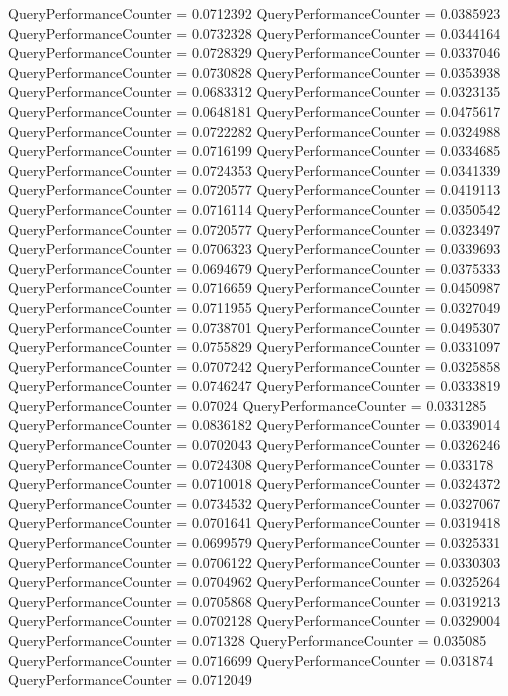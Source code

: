 \documentclass[9pt]{article}
\theoremstyle{plain}
\theoremstyle{definition}
\theoremstyle{remark}
\numberwithin{equation}{section}
\begin{document}
QueryPerformanceCounter  =  0.0712392
QueryPerformanceCounter  =  0.0385923
QueryPerformanceCounter  =  0.0732328
QueryPerformanceCounter  =  0.0344164
QueryPerformanceCounter  =  0.0728329
QueryPerformanceCounter  =  0.0337046
QueryPerformanceCounter  =  0.0730828
QueryPerformanceCounter  =  0.0353938
QueryPerformanceCounter  =  0.0683312
QueryPerformanceCounter  =  0.0323135
QueryPerformanceCounter  =  0.0648181
QueryPerformanceCounter  =  0.0475617
QueryPerformanceCounter  =  0.0722282
QueryPerformanceCounter  =  0.0324988
QueryPerformanceCounter  =  0.0716199
QueryPerformanceCounter  =  0.0334685
QueryPerformanceCounter  =  0.0724353
QueryPerformanceCounter  =  0.0341339
QueryPerformanceCounter  =  0.0720577
QueryPerformanceCounter  =  0.0419113
QueryPerformanceCounter  =  0.0716114
QueryPerformanceCounter  =  0.0350542
QueryPerformanceCounter  =  0.0720577
QueryPerformanceCounter  =  0.0323497
QueryPerformanceCounter  =  0.0706323
QueryPerformanceCounter  =  0.0339693
QueryPerformanceCounter  =  0.0694679
QueryPerformanceCounter  =  0.0375333
QueryPerformanceCounter  =  0.0716659
QueryPerformanceCounter  =  0.0450987
QueryPerformanceCounter  =  0.0711955
QueryPerformanceCounter  =  0.0327049
QueryPerformanceCounter  =  0.0738701
QueryPerformanceCounter  =  0.0495307
QueryPerformanceCounter  =  0.0755829
QueryPerformanceCounter  =  0.0331097
QueryPerformanceCounter  =  0.0707242
QueryPerformanceCounter  =  0.0325858
QueryPerformanceCounter  =  0.0746247
QueryPerformanceCounter  =  0.0333819
QueryPerformanceCounter  =  0.07024
QueryPerformanceCounter  =  0.0331285
QueryPerformanceCounter  =  0.0836182
QueryPerformanceCounter  =  0.0339014
QueryPerformanceCounter  =  0.0702043
QueryPerformanceCounter  =  0.0326246
QueryPerformanceCounter  =  0.0724308
QueryPerformanceCounter  =  0.033178
QueryPerformanceCounter  =  0.0710018
QueryPerformanceCounter  =  0.0324372
QueryPerformanceCounter  =  0.0734532
QueryPerformanceCounter  =  0.0327067
QueryPerformanceCounter  =  0.0701641
QueryPerformanceCounter  =  0.0319418
QueryPerformanceCounter  =  0.0699579
QueryPerformanceCounter  =  0.0325331
QueryPerformanceCounter  =  0.0706122
QueryPerformanceCounter  =  0.0330303
QueryPerformanceCounter  =  0.0704962
QueryPerformanceCounter  =  0.0325264
QueryPerformanceCounter  =  0.0705868
QueryPerformanceCounter  =  0.0319213
QueryPerformanceCounter  =  0.0702128
QueryPerformanceCounter  =  0.0329004
QueryPerformanceCounter  =  0.071328
QueryPerformanceCounter  =  0.035085
QueryPerformanceCounter  =  0.0716699
QueryPerformanceCounter  =  0.031874
QueryPerformanceCounter  =  0.0712049
\end{document}
